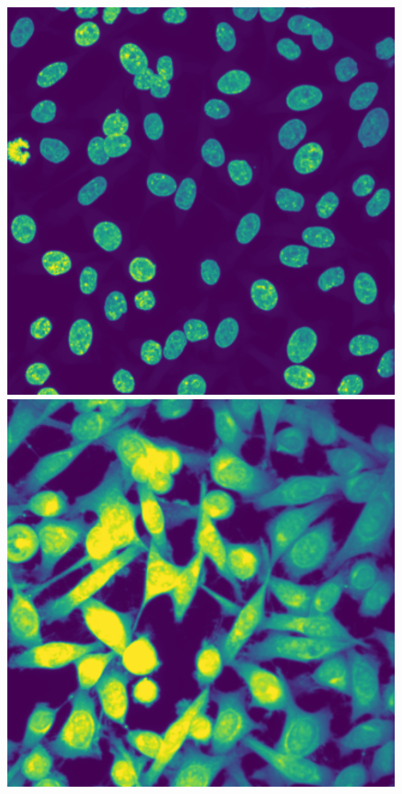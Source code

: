 \begin{figure}[]
	\centering
		\includegraphics[width=0.95\linewidth]{figures/chapter3/dapi_BICD2}
		\vfill
		\includegraphics[width=0.95\linewidth]{figures/chapter3/cellmask_BICD2}

\end{figure}
